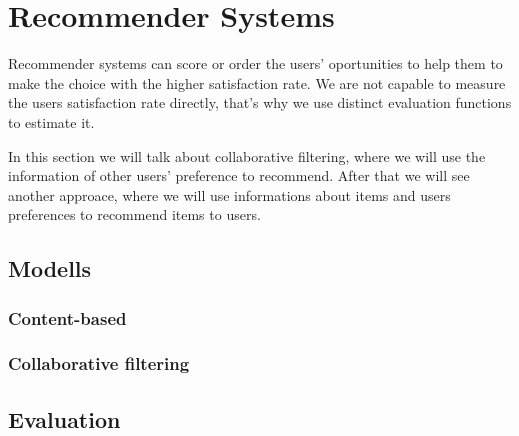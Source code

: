 \chapter{Recommender Systems}
Recommender systems can score or order the users' oportunities to help them to
make the choice with the higher satisfaction rate. We are not capable to measure
the users satisfaction rate directly, that's why we use distinct evaluation functions
to estimate it.

In this section we will talk about collaborative filtering, where we will use the
information of other users' preference to recommend. After that we will see another
approace, where we will use informations about items and users preferences to recommend
items to users.

\section{Modells}
\subsection{Content-based}
\subsection{Collaborative filtering}

\section{Evaluation}
